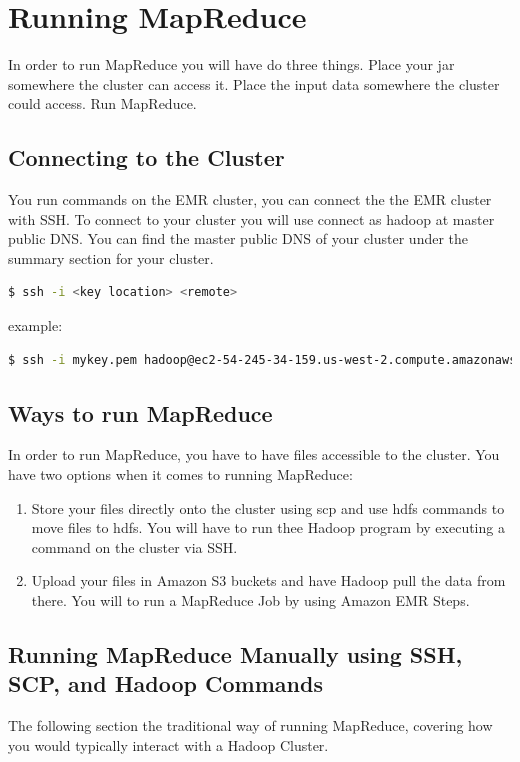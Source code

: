 \documentclass{article}
\begin{document}

\section{Running MapReduce}
In order to run MapReduce you will have do three things. Place your jar somewhere the cluster can access it. Place the input data somewhere the cluster could access. Run MapReduce. 
\subsection{Connecting to the Cluster}
You run commands on the EMR cluster, you can connect the the EMR cluster with SSH. To connect to your cluster you will use connect as hadoop at master public DNS. You can find the master public DNS of your cluster under the summary section for your cluster.
\begin{lstlisting}[language=bash]
  $ ssh -i <key location> <remote>
\end{lstlisting}
example:
\begin{lstlisting}[language=bash]
  $ ssh -i mykey.pem hadoop@ec2-54-245-34-159.us-west-2.compute.amazonaws.com
\end{lstlisting}



\subsection{Ways to run MapReduce }
In order to run MapReduce, you have to have files accessible to the cluster. You have two options when it comes to running MapReduce: 
\begin{enumerate} 
\item Store your files directly onto the cluster using scp and use hdfs commands to move files to hdfs. You will have to run thee Hadoop program by executing a command on the cluster via SSH. 
\item Upload your files in Amazon S3 buckets and have Hadoop pull the data from there. You will to run a MapReduce Job by using Amazon EMR Steps.
\end{enumerate}

\subsection{Running MapReduce Manually using SSH, SCP, and Hadoop Commands}
The following section the traditional way of running MapReduce, covering how you would typically interact with a Hadoop Cluster.
\end{document}
